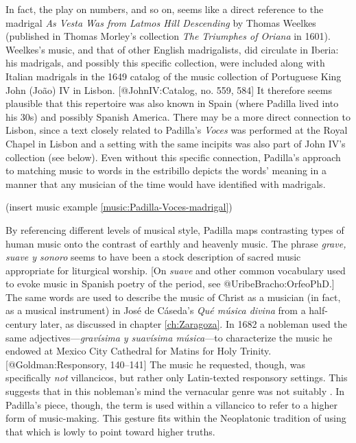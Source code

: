 In fact, the play on numbers,  and so on, seems like a direct
reference to the madrigal \emph{As Vesta Was from Latmos Hill Descending} by Thomas
Weelkes (published in Thomas Morley's collection \emph{The Triumphes of Oriana} in
1601).
Weelkes's music, and that of other English madrigalists, did circulate in
Iberia: his madrigals, and possibly this specific collection, were included
along with Italian madrigals in the 1649 catalog of the music collection of
Portuguese King John (João) IV in Lisbon.
[@JohnIV:Catalog, no. 559, 584]
It therefore seems plausible that this repertoire was also known in Spain
(where Padilla lived into his 30s) and possibly Spanish America.
There may be a more direct connection to Lisbon, since a text closely related to
Padilla's \emph{Voces} was performed at the Royal Chapel in Lisbon and a setting with
the same incipits was also part of John IV's collection (see below).
Even without this specific connection, Padilla's approach to matching music to
words in the estribillo depicts the words' meaning in a manner that any musician
of the time would have identified with madrigals.

(insert music example \ref{music:Padilla-Voces-madrigal})
\label{music:Padilla-Voces-madrigal}

By referencing different levels of musical style, Padilla maps contrasting types
of human music onto the contrast of earthly and heavenly music.
The phrase \emph{grave, suave y sonoro} seems to have been a stock description of
sacred music appropriate for liturgical worship.
[On \emph{suave} and other common vocabulary used to evoke music in Spanish poetry of
the period, see @UribeBracho:OrfeoPhD.]
The same words are used to describe the music of Christ as a musician (in fact,
as a musical instrument) in José de Cáseda's \emph{Qué música divina} from a
half-century later, as discussed in chapter \ref{ch:Zaragoza}.
In 1682 a nobleman used the same adjectives---\emph{gravísima y suavísima
música}---to characterize the music he endowed at Mexico City Cathedral for
Matins for Holy Trinity.
[@Goldman:Responsory, 140--141]
The music he requested, though, was specifically \emph{not} villancicos, but rather
only Latin-texted responsory settings.
This suggests that in this nobleman's mind the vernacular genre was not suitably
.
In Padilla's piece, though, the term is used within a villancico to refer to a
higher form of music-making. 
This gesture fits within the Neoplatonic tradition of using that which is lowly
to point toward higher truths.

